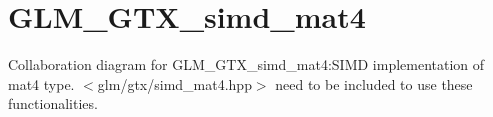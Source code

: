 \hypertarget{group__gtx__simd__mat4}{
\section{GLM\_\-GTX\_\-simd\_\-mat4}
\label{group__gtx__simd__mat4}
}


Collaboration diagram for GLM\_\-GTX\_\-simd\_\-mat4:SIMD implementation of mat4 type.  
$<$glm/gtx/simd\_\-mat4.hpp$>$ need to be included to use these functionalities. 